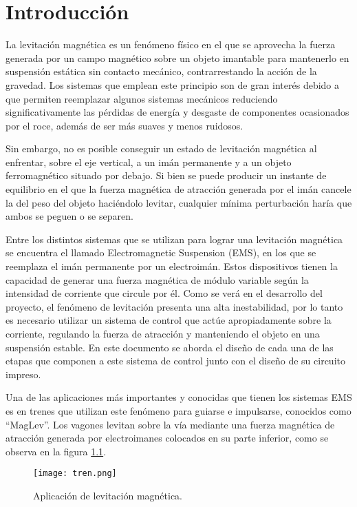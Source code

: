 \chapter{Introducción}  \label{cap:Introducción}

La levitación magnética es un fenómeno físico en el que se aprovecha la fuerza generada por un campo magnético sobre un objeto imantable para mantenerlo en suspensión estática sin contacto mecánico, contrarrestando la acción de la gravedad. Los sistemas que emplean este principio son de gran interés debido a que permiten reemplazar algunos sistemas mecánicos reduciendo significativamente las pérdidas de energía y desgaste de componentes ocasionados por el roce, además de ser más suaves y menos ruidosos.

Sin embargo, no es posible conseguir un estado de levitación magnética al enfrentar, sobre el eje vertical, a un imán permanente y a un objeto ferromagnético situado por debajo. Si bien se puede producir un instante de equilibrio en el que la fuerza magnética de atracción generada por el imán cancele la del peso del objeto haciéndolo levitar, cualquier mínima perturbación haría que ambos se peguen o se separen.

Entre los distintos sistemas que se utilizan para lograr una levitación magnética se encuentra el llamado Electromagnetic Suspension (EMS), en los que se reemplaza el imán permanente por un electroimán. Estos dispositivos tienen la capacidad de generar una fuerza magnética de módulo variable según la intensidad de corriente que circule por él. Como se verá en el desarrollo del proyecto, el fenómeno de levitación presenta una alta inestabilidad, por lo tanto es necesario utilizar un sistema de control que actúe apropiadamente sobre la corriente, regulando la fuerza de atracción y manteniendo el objeto en una suspensión estable. En este documento se aborda el diseño de cada una de las etapas que componen a este sistema de control junto con el diseño de su circuito impreso. 

Una de las aplicaciones más importantes y conocidas que tienen los sistemas EMS es en trenes que utilizan este fenómeno para guiarse e impulsarse, conocidos como ``MagLev''. Los vagones levitan sobre la vía mediante una fuerza magnética de atracción generada por electroimanes colocados en su parte inferior, como se  observa en la figura \ref{fig:img_tren}. 


\begin{figure}[H]
	\centering
	\texttt{[image: tren.png]}
	\caption{Aplicación de levitación magnética.}
	\label{fig:img_tren}
\end{figure}

